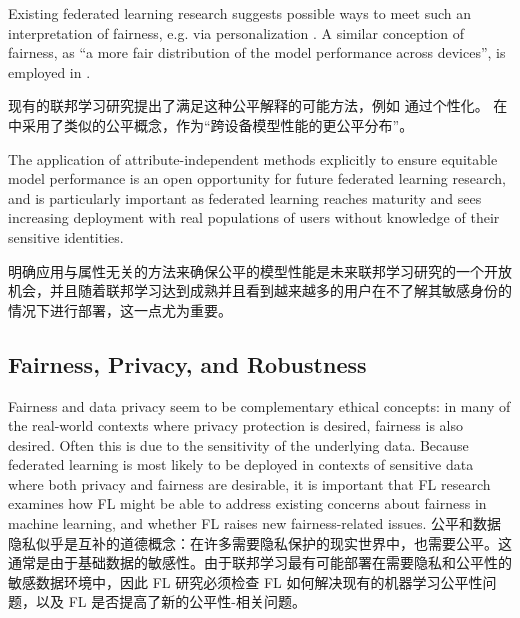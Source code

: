 Existing federated learning research suggests possible ways to meet such an interpretation of fairness, e.g. via personalization \cite{jiang2019improving, wang2019federated}. A similar conception of fairness, as ``a more fair distribution of the model performance across devices'', is employed in \cite{li2019fair}. 

现有的联邦学习研究提出了满足这种公平解释的可能方法，例如 通过个性化\cite{jiang2019improving, wang2019federated}。 在\cite{li2019fair} 中采用了类似的公平概念，作为“跨设备模型性能的更公平分布”。

The application of attribute-independent methods explicitly to ensure equitable model performance is an open opportunity for future federated learning research, and is particularly important as federated learning reaches maturity and sees increasing deployment with real populations of users without knowledge of their sensitive identities.

明确应用与属性无关的方法来确保公平的模型性能是未来联邦学习研究的一个开放机会，并且随着联邦学习达到成熟并且看到越来越多的用户在不了解其敏感身份的情况下进行部署，这一点尤为重要。

\subsection{Fairness, Privacy, and Robustness}\label{subsec:fairness-privacy-robustness}

Fairness and data privacy seem to be complementary ethical concepts: in many of the real-world contexts where privacy protection is desired, fairness is also desired. Often this is due to the sensitivity of the underlying data. Because federated learning is most likely to be deployed in contexts of sensitive data where both privacy and fairness are desirable, it is important that FL research examines how FL might be able to address existing concerns about fairness in machine learning, and whether FL raises new fairness-related issues.
公平和数据隐私似乎是互补的道德概念：在许多需要隐私保护的现实世界中，也需要公平。这通常是由于基础数据的敏感性。由于联邦学习最有可能部署在需要隐私和公平性的敏感数据环境中，因此 FL 研究必须检查 FL 如何解决现有的机器学习公平性问题，以及 FL 是否提高了新的公平性-相关问题。

